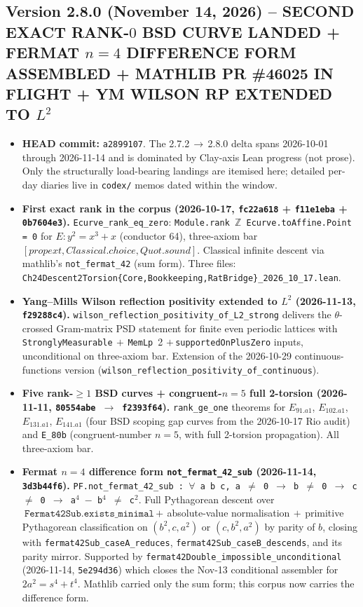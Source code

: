 \subsection*{Version 2.8.0 (November 14, 2026) -- SECOND EXACT RANK-$0$ BSD CURVE LANDED + FERMAT $n = 4$ DIFFERENCE FORM ASSEMBLED + MATHLIB PR \#46025 IN FLIGHT + YM WILSON RP EXTENDED TO $L^2$}
\begin{itemize}

\item \textbf{HEAD commit:} \texttt{a2899107}.  The 2.7.2$\,\to\,$2.8.0
delta spans 2026-10-01 through 2026-11-14 and is dominated by
Clay-axis Lean progress (not prose).  Only the structurally load-bearing
landings are itemised here; detailed per-day diaries live in
\texttt{codex/} memos dated within the window.

\item \textbf{First exact rank in the corpus (2026-10-17,
\texttt{fc22a618} + \texttt{f11e1eba} + \texttt{0b7604e3}).}
\texttt{Ecurve\_rank\_eq\_zero}: \texttt{Module.rank $\mathbb{Z}$
Ecurve.toAffine.Point = 0} for $E : y^2 = x^3 + x$ (conductor 64),
three-axiom bar $[propext, Classical.choice,
Quot.sound]$.  Classical infinite descent via mathlib's
\texttt{not\_fermat\_42} (sum form).  Three files:
\texttt{Ch24Descent2Torsion\{Core,Bookkeeping,RatBridge\}\_2026\_10\_17.lean}.

\item \textbf{Yang--Mills Wilson reflection positivity extended to
$L^2$ (2026-11-13, \texttt{f29288c4}).}
\texttt{wilson\_reflection\_positivity\_of\_L2\_strong} delivers the
$\theta$-crossed Gram-matrix PSD statement for finite even periodic
lattices with \texttt{StronglyMeasurable}$\,+\,$\texttt{MemLp}~2
$+\,$\texttt{supportedOnPlusZero} inputs, unconditional on three-axiom
bar.  Extension of the 2026-10-29 continuous-functions version
(\texttt{wilson\_reflection\_positivity\_of\_continuous}).

\item \textbf{Five rank-$\ge 1$ BSD curves + congruent-$n = 5$ full
2-torsion (2026-11-11, \texttt{80554abe}~$\to$~\texttt{f2393f64}).}
\texttt{rank\_ge\_one} theorems for $E_{91.a1}$, $E_{102.a1}$,
$E_{131.a1}$, $E_{141.a1}$ (four BSD scoping gap curves from the
2026-10-17 Rio audit) and \texttt{E\_80b} (congruent-number $n = 5$,
with full 2-torsion propagation).  All three-axiom bar.

\item \textbf{Fermat $n = 4$ difference form \texttt{not\_fermat\_42\_sub}
(2026-11-14, \texttt{3d3b44f6}).}
\texttt{PF.not\_fermat\_42\_sub : $\forall$ a b c, a $\ne$ 0 $\to$
b $\ne$ 0 $\to$ c $\ne$ 0 $\to$ a$^4$ $-$ b$^4$ $\ne$ c$^2$}.
Full Pythagorean descent over
$\texttt{Fermat42Sub.exists\_minimal}\,+\,$absolute-value
normalisation$\,+\,$primitive Pythagorean classification on
$(b^2, c, a^2)$ or $(c, b^2, a^2)$ by parity of $b$, closing with
\texttt{fermat42Sub\_caseA\_reduces},
\texttt{fermat42Sub\_caseB\_descends}, and its parity mirror.
Supported by \texttt{fermat42Double\_impossible\_unconditional}
(2026-11-14, \texttt{5e294d36}) which closes the Nov-13 conditional
assembler for $2a^2 = s^4 + t^4$.  Mathlib carried only the sum form;
this corpus now carries the difference form.


\end{itemize}
